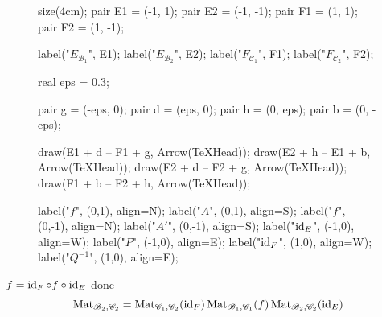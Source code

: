 \begin{prv}
	\begin{wrapfigure}{l}{4cm}
		\vspace{-1cm}
		\begin{asy}
			size(4cm);
			pair E1 = (-1, 1);
			pair E2 = (-1, -1);
			pair F1 = (1, 1);
			pair F2 = (1, -1);

			label("$E_{\mathcal{B}_1}$", E1);
			label("$E_{\mathcal{B}_2}$", E2);
			label("$F_{\mathcal{C}_1}$", F1);
			label("$F_{\mathcal{C}_2}$", F2);

			real eps = 0.3;

			pair g = (-eps, 0);
			pair d = (eps, 0);
			pair h = (0, eps);
			pair b = (0, -eps);

			draw(E1 + d -- F1 + g, Arrow(TeXHead));
			draw(E2 + h -- E1 + b, Arrow(TeXHead));
			draw(E2 + d -- F2 + g, Arrow(TeXHead));
			draw(F1 + b -- F2 + h, Arrow(TeXHead));

			label("\small $f$", (0,1), align=N);
			label("\small $A$", (0,1), align=S);
			label("\small $f$", (0,-1), align=N);
			label("\small $A'$", (0,-1), align=S);
			label("\small $\operatorname{id}_E$", (-1,0), align=W);
			label("\small $P$", (-1,0), align=E);
			label("\small $\operatorname{id}_F$", (1,0), align=W);
			label("\small $Q^{-1}$", (1,0), align=E);
		\end{asy}
	\end{wrapfigure}

	$f = \operatorname{id}_F  \circ f \circ \operatorname{id}_E$ donc \[
		\operatorname{Mat}_{\mathcal{B}_2,\mathcal{C}_2} = \operatorname{Mat}_{\mathcal{C}_1,\mathcal{C}_2}(\operatorname{id}_F)
		\operatorname{Mat}_{\mathcal{B}_1,\mathcal{C}_1}(f)
		\operatorname{Mat}_{\mathcal{B}_2,\mathcal{C}_2}(\operatorname{id}_E)
	\]
	\vspace{2cm}
\end{prv}

